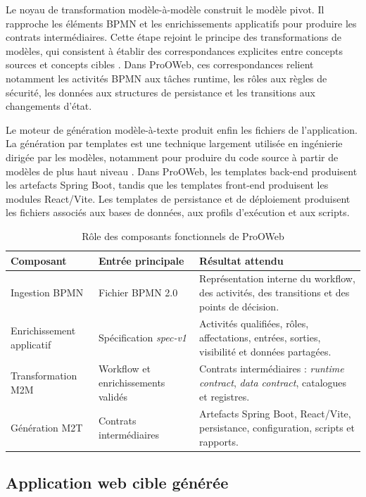 Le noyau de transformation modèle-à-modèle construit le modèle pivot. Il rapproche les éléments BPMN et les enrichissements applicatifs pour produire les contrats intermédiaires. Cette étape rejoint le principe des transformations de modèles, qui consistent à établir des correspondances explicites entre concepts sources et concepts cibles \cite{omgqvt}. Dans ProOWeb, ces correspondances relient notamment les activités BPMN aux tâches runtime, les rôles aux règles de sécurité, les données aux structures de persistance et les transitions aux changements d'état.

Le moteur de génération modèle-à-texte produit enfin les fichiers de l'application. La génération par templates est une technique largement utilisée en ingénierie dirigée par les modèles, notamment pour produire du code source à partir de modèles de plus haut niveau \cite{syriani2018}. Dans ProOWeb, les templates back-end produisent les artefacts Spring Boot, tandis que les templates front-end produisent les modules React/Vite. Les templates de persistance et de déploiement produisent les fichiers associés aux bases de données, aux profils d'exécution et aux scripts.

\begin{table}[H]
\centering
\small
\caption{Rôle des composants fonctionnels de ProOWeb}
\label{tab:chap3-composants-framework}
\begin{tabular}{p{3.5cm}p{4.5cm}p{5.8cm}}
\hline
\textbf{Composant} & \textbf{Entrée principale} & \textbf{Résultat attendu} \\
\hline
Ingestion BPMN & Fichier BPMN 2.0 & Représentation interne du workflow, des activités, des transitions et des points de décision. \\
Enrichissement applicatif & Spécification \textit{spec-v1} & Activités qualifiées, rôles, affectations, entrées, sorties, visibilité et données partagées. \\
Transformation M2M & Workflow et enrichissements validés & Contrats intermédiaires : \textit{runtime contract}, \textit{data contract}, catalogues et registres. \\
Génération M2T & Contrats intermédiaires & Artefacts Spring Boot, React/Vite, persistance, configuration, scripts et rapports. \\
\hline
\end{tabular}
\end{table}

\subsection{Application web cible générée}

